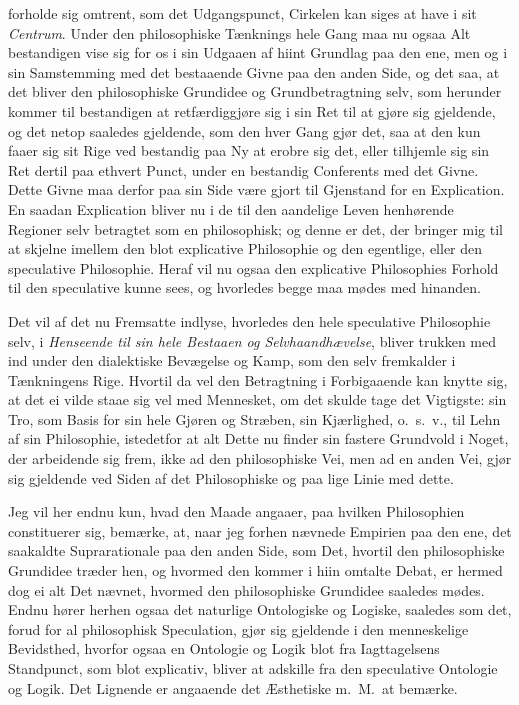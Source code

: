 \documentclass[12pt,a4paper]{book}
\newcommand{\apage}[1]{\marginnote{\footnotesize\textit{[#1]}}}
\begin{document}
forholde sig omtrent, som det Udgangspunct, Cirkelen kan siges at have
i sit \emph{Centrum}. Under den philosophiske Tænknings hele Gang maa nu ogsaa
Alt bestandigen vise sig for os i sin Udgaaen af hiint Grundlag paa den
ene, men og i sin Samstemming med det bestaaende Givne paa den anden
Side, og det saa, at det bliver den philosophiske Grundidee og
Grundbetragtning selv, som herunder kommer til bestandigen at
retfærdiggjøre sig i sin Ret til at gjøre sig gjeldende, og det netop
saaledes gjeldende, som den hver Gang gjør det, saa at den kun faaer
sig sit Rige ved bestandig paa Ny at erobre sig det, eller tilhjemle
sig sin Ret dertil paa ethvert Punct, under en bestandig Conferents med
det Givne. Dette Givne maa derfor paa sin Side være gjort til Gjenstand
for en Explication. En saadan Explication bliver nu i de til den
aandelige Leven henhørende Regioner selv betragtet som en philosophisk;
og denne er det, der bringer mig til at skjelne imellem den blot
explicative Philosophie og den egentlige, eller den speculative
Philosophie. Heraf vil nu ogsaa den explicative Philosophies Forhold
til den speculative kunne sees, og hvorledes begge maa mødes med
hinanden.

Det vil af det nu Fremsatte indlyse, hvorledes den hele speculative
Philosophie selv, i \emph{Henseende til sin hele Bestaaen og
Selvhaandhævelse}, bliver trukken med ind under den dialektiske
Bevægelse og Kamp, som den selv fremkalder i Tænkningens Rige. Hvortil
da vel den Betragtning i Forbigaaende kan knytte sig, at det ei vilde
staae sig vel med Mennesket, om det skulde tage det Vigtigste: sin Tro,
som Basis for sin hele Gjøren og Stræben, sin Kjærlighed, o.\ s.\ v.,
til Lehn af sin Philosophie, istedetfor at alt Dette nu finder sin
fastere Grundvold i Noget, der arbeidende sig frem, ikke ad den
philosophiske Vei, men ad en anden Vei, gjør sig gjeldende ved Siden af
det Philosophiske og paa lige Linie med dette.

\apage{48} Jeg vil her endnu kun, hvad den Maade angaaer, paa hvilken Philosophien
constituerer sig, bemærke, at, naar jeg forhen nævnede Empirien paa den
ene, det saakaldte Suprarationale paa den anden Side, som Det, hvortil
den philosophiske Grundidee træder hen, og hvormed den kommer i hiin
omtalte Debat, er hermed dog ei alt Det nævnet, hvormed den
philosophiske Grundidee saaledes mødes. Endnu hører herhen ogsaa det
naturlige Ontologiske og Logiske, saaledes som det, forud for al
philosophisk Speculation, gjør sig gjeldende i den menneskelige
Bevidsthed, hvorfor ogsaa en Ontologie og Logik blot fra Iagttagelsens
Standpunct, som blot explicativ, bliver at adskille fra den speculative
Ontologie og Logik. Det Lignende er angaaende det Æsthetiske m.\ M.\ at
bemærke.
\end{document}
